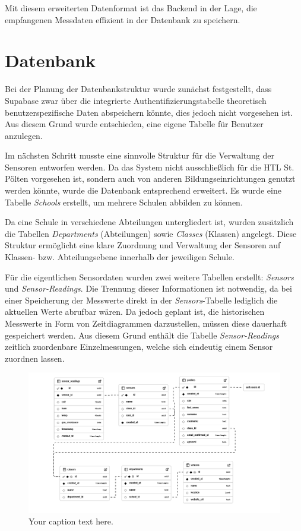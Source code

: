 \begin{inhalt}
Mit diesem erweiterten Datenformat ist das Backend in der Lage, die empfangenen Messdaten effizient in der Datenbank zu speichern.

\section{Datenbank}

Bei der Planung der Datenbankstruktur wurde zunächst festgestellt, dass Supabase zwar über die integrierte Authentifizierungstabelle theoretisch benutzerspezifische Daten abspeichern könnte, dies jedoch nicht vorgesehen ist. Aus diesem Grund wurde entschieden, eine eigene Tabelle für Benutzer anzulegen.

Im nächsten Schritt musste eine sinnvolle Struktur für die Verwaltung der Sensoren entworfen werden. Da das System nicht ausschließlich für die HTL St. Pölten vorgesehen ist, sondern auch von anderen Bildungseinrichtungen genutzt werden könnte, wurde die Datenbank entsprechend erweitert. Es wurde eine Tabelle \textit{Schools} erstellt, um mehrere Schulen abbilden zu können.

Da eine Schule in verschiedene Abteilungen untergliedert ist, wurden zusätzlich die Tabellen \textit{Departments} (Abteilungen) sowie \textit{Classes} (Klassen) angelegt. Diese Struktur ermöglicht eine klare Zuordnung und Verwaltung der Sensoren auf Klassen- bzw. Abteilungsebene innerhalb der jeweiligen Schule.

Für die eigentlichen Sensordaten wurden zwei weitere Tabellen erstellt: \textit{Sensors} und \textit{Sensor-Readings}. Die Trennung dieser Informationen ist notwendig, da bei einer Speicherung der Messwerte direkt in der \textit{Sensors}-Tabelle lediglich die aktuellen Werte abrufbar wären. Da jedoch geplant ist, die historischen Messwerte in Form von Zeitdiagrammen darzustellen, müssen diese dauerhaft gespeichert werden. Aus diesem Grund enthält die Tabelle \textit{Sensor-Readings} zeitlich zuordenbare Einzelmessungen, welche sich eindeutig einem Sensor zuordnen lassen.


\newpage


\begin{figure}
  \centering
  \includegraphics[scale=0.45]{files/Thomas/pics/output.png}
  \caption[Bildbezeichnung für Abbildungsverzeichnis]{Your caption text here.}
  \label{fig:gehaeuse_internet_bild}
\end{figure}


\end{inhalt}

